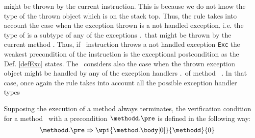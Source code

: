 \begin{itemize}
						might be thrown by the current instruction. This is because we do not know the type of the thrown object which is
						on the stack top. Thus, the rule takes into account the case when the exception thrown is a not handled exception,
						i.e. the type    of \stack{\counter} is a subtype of any  of the exceptions \methodd.\exceptions \ that might be thrown
						by the current method \methodd. Thus, if  \athrow \ instruction throws a not handled exception \texttt{Exc} 
						the weakest precondition of the instruction is the exceptional postcondition as the Def. \ref{defExc} states.
 						The \fwpi \ considers also the case when the thrown exception object  might be handled by any of the
						exception handlers \methodd.\excHandlerTable \ of method \ \methodd. 
						In that case, once again the rule takes into account all the possible exception handler types
						
					
					
						
	 			
\end{itemize}


Supposing the execution of a method always terminates, the verification condition for a method \methodd \ with a
 precondition $\methodd.\pre$ is defined in the following way:
$$ \methodd.\pre \Rightarrow \wpi{\method.\body[0]}{\methodd}{0}$$





